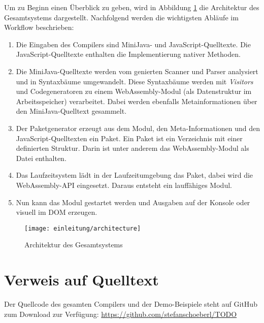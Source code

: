 Um zu Beginn einen Überblick zu geben, wird in Abbildung \ref{fig:architecture} die Architektur des Gesamtsystems dargestellt. Nachfolgend werden die wichtigsten Abläufe im Workflow beschrieben:
\begin{enumerate}
    \item Die Eingaben des Compilers sind MiniJava- und Ja\-va\-Script-Quelltexte. Die Ja\-va\-Script-Quelltexte enthalten die Implementierung nativer Methoden.
    \item Die MiniJava-Quelltexte werden vom genierten Scanner und Parser analysiert und in Syntaxbäume umgewandelt. Diese Syntaxbäume werden mit \emph{Visitors} und Codegeneratoren zu einem WebAssembly-Modul (als Datenstruktur im Arbeitsspeicher) verarbeitet. Dabei werden ebenfalls Metainformationen über den MiniJava-Quelltext gesammelt.
    \item Der Paketgenerator erzeugt aus dem Modul, den Meta-Informationen und den JavaScript-Quelltexten ein Paket. Ein Paket ist ein Verzeichnis mit einer definierten Struktur. Darin ist unter anderem das WebAssembly-Modul als Datei enthalten.
    \item Das Laufzeitsystem lädt in der Laufzeitumgebung das Paket, dabei wird die Web\-As\-sem\-bly-API eingesetzt. Daraus entsteht ein lauffähiges Modul.
    \item Nun kann das Modul gestartet werden und Ausgaben auf der Konsole oder visuell im DOM erzeugen.
\end{enumerate}


\begin{figure}[]
    \centering
    \texttt{[image: einleitung/architecture]}
    \caption{Architektur des Gesamtsystems}
    \label{fig:architecture}
\end{figure}

\section{Verweis auf Quelltext}
Der Quellcode des gesamten Compilers und der Demo-Beispiele steht auf GitHub zum Download zur Verfügung: \url{https://github.com/stefanschoeberl/TODO}
